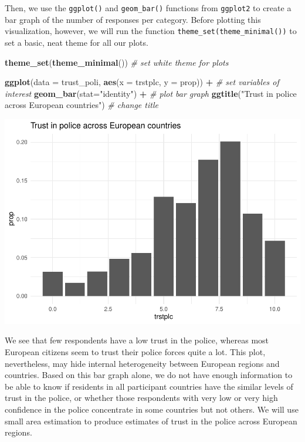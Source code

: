 \documentclass[
]{article}
\newenvironment{Shaded}{\begin{snugshade}}{\end{snugshade}}
\newcommand{\CommentTok}[1]{\textcolor[rgb]{0.56,0.35,0.01}{\textit{#1}}}
\newcommand{\DataTypeTok}[1]{\textcolor[rgb]{0.13,0.29,0.53}{#1}}
\newcommand{\KeywordTok}[1]{\textcolor[rgb]{0.13,0.29,0.53}{\textbf{#1}}}
\newcommand{\NormalTok}[1]{#1}
\newcommand{\OperatorTok}[1]{\textcolor[rgb]{0.81,0.36,0.00}{\textbf{#1}}}
\newcommand{\StringTok}[1]{\textcolor[rgb]{0.31,0.60,0.02}{#1}}
\begin{document}
Then, we use the \texttt{ggplot()} and \texttt{geom\_bar()} functions
from \texttt{ggplot2} to create a bar graph of the number of responses
per category. Before plotting this visualization, however, we will run
the function \texttt{theme\_set(theme\_minimal())} to set a basic, neat
theme for all our plots.

\begin{Shaded}
\begin{Highlighting}[]
\KeywordTok{theme_set}\NormalTok{(}\KeywordTok{theme_minimal}\NormalTok{()) }\CommentTok{# set white theme for plots}

\KeywordTok{ggplot}\NormalTok{(}\DataTypeTok{data =}\NormalTok{ trust_poli, }\KeywordTok{aes}\NormalTok{(}\DataTypeTok{x =}\NormalTok{ trstplc, }\DataTypeTok{y =}\NormalTok{ prop)) }\OperatorTok{+}\StringTok{ }\CommentTok{# set variables of interest}
\StringTok{  }\KeywordTok{geom_bar}\NormalTok{(}\DataTypeTok{stat=}\StringTok{"identity"}\NormalTok{) }\OperatorTok{+}\StringTok{                           }\CommentTok{# plot bar graph}
\StringTok{  }\KeywordTok{ggtitle}\NormalTok{(}\StringTok{"Trust in police across European countries"}\NormalTok{)  }\CommentTok{# change title}
\end{Highlighting}
\end{Shaded}

\includegraphics{chapter_files/figure-latex/plot trust police-1.pdf}

We see that few respondents have a low trust in the police, whereas most
European citizens seem to trust their police forces quite a lot. This
plot, nevertheless, may hide internal heterogeneity between European
regions and countries. Based on this bar graph alone, we do not have
enough information to be able to know if residents in all participant
countries have the similar levels of trust in the police, or whether
those respondents with very low or very high confidence in the police
concentrate in some countries but not others. We will use small area
estimation to produce estimates of trust in the police across European
regions.
\end{document}
